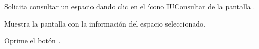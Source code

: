 \begin{UCtrayectoria}
	\UCpaso [\UCactor] Solicita consultar un espacio dando clic en el ícono IUConsultar
	de la pantalla . 
	
	\UCpaso[\UCsist] Muestra la pantalla  con la información del espacio seleccionado.
	
	\UCpaso [\UCactor] Oprime el botón . 
\end{UCtrayectoria}